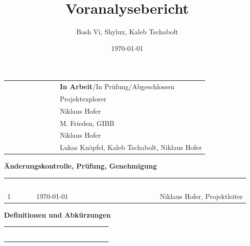 \documentclass[10pt,paper=a4,final]{scrartcl}
\title{Voranalysebericht}
\author{Bash Vi, Shylux, Kaleb Tschabolt}
\date{\today}
\begin{document}
\maketitle
\newpage
\begin{tabularx}{\textwidth}{ r X }	%
\textcolor{white}{{\bf Status}}\cellcolor{blue!80!} & {\bf In Arbeit}/In Prüfung/Abgeschlossen\cellcolor{blue!20!} \\
\textcolor{white}{{\bf Projektname}}\cellcolor{blue!80!} & Projektexplorer\cellcolor{blue!20!} \\
\textcolor{white}{{\bf Projektleiter}}\cellcolor{blue!80!} & Niklaus Hofer\cellcolor{blue!20!} \\
\textcolor{white}{{\bf Auftraggeber}}\cellcolor{blue!80!} & M. Frieden, GIBB\cellcolor{blue!20!} \\
\textcolor{white}{{\bf Autoren}}\cellcolor{blue!80!} & Niklaus Hofer\cellcolor{blue!20!} \\
\textcolor{white}{{\bf Verteiler}}\cellcolor{blue!80!} & Lukas Knöpfel, Kaleb Tschabolt, Niklaus Hofer\cellcolor{blue!20!}
\end{tabularx}
\newline
\newline
\newline
{\bf Änderungskontrolle, Prüfung, Genehmigung}
\newline

\begin{tabularx}{\textwidth}{l l X X}
\textcolor{white}{Version}\cellcolor{blue!80!} & \textcolor{white}{Datum}\cellcolor{blue!80!} & \textcolor{white}{Beschreibung, Bemerkung}\cellcolor{blue!80!} & \textcolor{white}{Name oder Rolle}\cellcolor{blue!80!} \\
\cellcolor{blue!20!} 1& \cellcolor{blue!20!} \today{} & \cellcolor{blue!20!} & Niklaus Hofer, Projektleiter\cellcolor{blue!20!} \\
\end{tabularx}
\newline
\newline
\newline
{\bf Definitionen und Abkürzungen}
\newline

\begin{tabularx}{\textwidth}{l X}
\textcolor{white}{Begriff/ Abkürzung}\cellcolor{blue!80!} & \textcolor{white}{Bedeutung}\cellcolor{blue!80!} \\
\cellcolor{blue!20!} & \cellcolor{blue!20!} \\
\end{tabularx}
\newline
\newline
\newline

{}
\flushleft
\newpage
\tableofcontents
\newpage
\end{document}
